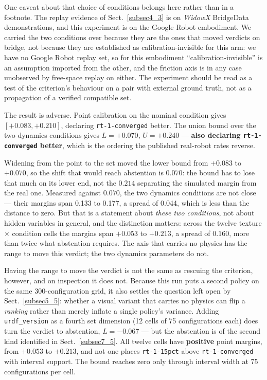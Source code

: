 \documentclass[pdflatex,iicol,sn-apa]{sn-jnl}
\theoremstyle{remark}
\begin{document}
One caveat about that choice of conditions belongs here rather than in a footnote. The replay
evidence of Sect.~\ref{subsec4_3} is on \emph{WidowX} BridgeData demonstrations, and this experiment
is on the Google Robot embodiment. We carried the two conditions over because they are the ones that
moved verdicts on bridge, not because they are established as calibration-invisible for this arm: we
have no Google Robot replay set, so for this embodiment ``calibration-invisible'' is an assumption
imported from the other, and the friction axis is in any case unobserved by free-space replay on
either. The experiment should be read as a test of the criterion's behaviour on a pair with external
ground truth, not as a propagation of a verified compatible set.

The result is adverse. Point calibration on the nominal condition gives $[+0.083, +0.210]$, declaring
\texttt{rt-1-converged} better. The union bound over the two dynamics conditions gives
$L = +0.070$, $U = +0.240$ --- \textbf{also declaring \texttt{rt-1-converged} better}, which is the
ordering the published real-robot rates reverse.

Widening from the point to the set moved the lower bound from $+0.083$ to $+0.070$, so the shift
that would reach abstention is $0.070$: the bound has to lose that much on its lower end, not the
$0.214$ separating the simulated margin from the real one. Measured against $0.070$, the two dynamics
conditions are not close --- their margins span 0.133 to 0.177, a spread of 0.044, which is less than
the distance to zero. But that is a statement about \emph{these two conditions}, not about hidden
variables in general, and the distinction matters: across the twelve texture $\times$ condition cells
the margins span $+0.053$ to $+0.213$, a spread of $0.160$, more than twice what abstention requires.
The axis that carries no physics has the range to move this verdict; the two dynamics parameters do
not.

Having the range to move the verdict is not the same as rescuing the criterion, however, and on
inspection it does not. Because this run puts a second policy on
the same 300-configuration grid, it also settles the question left open by Sect.~\ref{subsec5_5}:
whether a visual variant that carries no physics can flip a \emph{ranking} rather than merely
inflate a single policy's variance. Adding \texttt{urdf\_version} as a fourth set dimension (12 cells
of 75 configurations each) does turn the verdict to abstention, $L = -0.067$ --- but the abstention
is of the second kind identified in Sect.~\ref{subsec7_5}. All twelve cells have \textbf{positive}
point margins, from $+0.053$ to $+0.213$, and not one places \texttt{rt-1-15pct} above
\texttt{rt-1-converged} with interval support. The bound reaches zero only through interval width at
75 configurations per cell.
\end{document}
